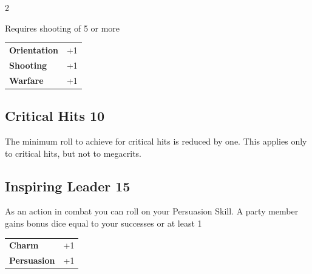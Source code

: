 \begin{multicols}{2}
\begin{tcolorbox}
Requires shooting of 5 or more


\vspace{3mm}

\begin{tabular}{@{}ll@{}}
    \textbf{Orientation} & +1\\
    \textbf{Shooting} & +1\\
    \textbf{Warfare} & +1\\
\end{tabular}


\end{tcolorbox}

\begin{tcolorbox}
    \subsection*{Critical Hits \hfill \small{10 }}
    \tcblower
The minimum roll to achieve for critical hits is reduced by one. This applies only to critical hits, but not to megacrits.


\vspace{3mm}



\end{tcolorbox}

\begin{tcolorbox}
    \subsection*{Inspiring Leader \hfill \small{15 }}
    \tcblower
As an action in combat you can roll on your Persuasion Skill. A party member gains bonus dice equal to your successes or at least 1


\vspace{3mm}

\begin{tabular}{@{}ll@{}}
    \textbf{Charm} & +1\\
    \textbf{Persuasion} & +1\\
\end{tabular}



\end{tcolorbox}
\end{multicols}
